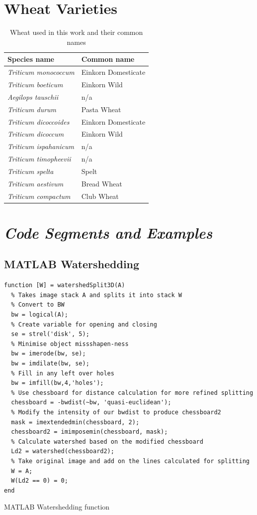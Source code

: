 \documentclass[11pt]{report}
\begin{document}
\section{Wheat Varieties}
\label{sec:orged54c92}
\begin{table}[htbp]
\caption{\label{tab:orge44a818}
Wheat used in this work and their common names}
\centering
\begin{tabularx}{\textwidth}{|X|X|}
\hline
\textbf{Species name} & \textbf{Common name}\\
\hline
\emph{Triticum monococcum} & Einkorn Domesticate\\
\hline
\emph{Triticum boeticum} & Einkorn Wild\\
\hline
\emph{Aegilops tauschii} & n/a\\
\hline
\emph{Triticum durum} & Pasta Wheat\\
\hline
\emph{Triticum dicoccoides} & Einkorn Domesticate\\
\hline
\emph{Triticum dicoccum} & Einkorn Wild\\
\hline
\emph{Triticum ispahanicum} & n/a\\
\hline
\emph{Triticum timopheevii} & n/a\\
\hline
\emph{Triticum spelta} & Spelt\\
\hline
\emph{Triticum aestivum} & Bread Wheat\\
\hline
\emph{Triticum compactum} & Club Wheat\\
\hline
\end{tabularx}
\end{table}



\clearpage
\section{\emph{Code Segments and Examples}}
\label{sec:org4db2191}
\subsection{MATLAB Watershedding}
\label{sec:orgdcca284}

\begin{listing}[htbp]
\begin{verbatim}
function [W] = watershedSplit3D(A)
  % Takes image stack A and splits it into stack W
  % Convert to BW
  bw = logical(A);
  % Create variable for opening and closing
  se = strel('disk', 5);
  % Minimise object missshapen-ness
  bw = imerode(bw, se);
  bw = imdilate(bw, se);
  % Fill in any left over holes
  bw = imfill(bw,4,'holes');
  % Use chessboard for distance calculation for more refined splitting
  chessboard = -bwdist(~bw, 'quasi-euclidean');
  % Modify the intensity of our bwdist to produce chessboard2
  mask = imextendedmin(chessboard, 2);
  chessboard2 = imimposemin(chessboard, mask);
  % Calculate watershed based on the modified chessboard
  Ld2 = watershed(chessboard2);
  % Take original image and add on the lines calculated for splitting
  W = A;
  W(Ld2 == 0) = 0;
end
\end{verbatim}
\caption{\label{org5276b2e}
MATLAB Watershedding function}
\end{listing}
\end{document}
